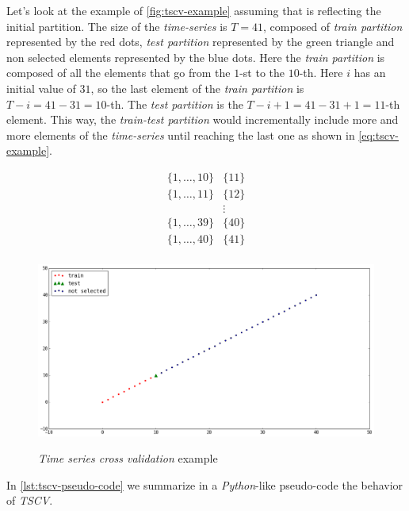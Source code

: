 Let's look at the example of \autoref{fig:tscv-example} assuming that
is reflecting the initial partition. The size of the
\textit{time-series} is $T = 41$, composed of \textit{train partition}
represented by the red dots, \textit{test partition} represented by
the green triangle and non selected elements represented by the blue
dots. Here the \textit{train partition} is composed of all the
elements that go from the $1$-st to the $10$-th. Here $i$ has an
initial value of $31$, so the last element of the \textit{train
partition} is $T - i = 41 - 31 = 10$-th. The \textit{test partition}
is the $T - i + 1 = 41 - 31 + 1 = 11$-th element. This way, the
\textit{train-test partition} would incrementally include more and
more elements of the \textit{time-series} until reaching the last one
as shown in \autoref{eq:tscv-example}.

\begin{equation}
  \begin{aligned}
    \label{eq:tscv-example}
    \{1,\dots,10\} & \{11\} \\
    \{1,\dots,11\} & \{12\} \\
    &\vdots \\
    \{1,\dots,39\} & \{40\} \\
    \{1,\dots,40\} & \{41\} \\
  \end{aligned}
\end{equation}

\begin{figure}[bth]
  \myfloatalign
  {\includegraphics[width=1\linewidth]
    {gfx/tscv-example}}
  \caption{\textit{Time series cross validation} example}
  \label{fig:tscv-example}
\end{figure}

In \autoref{lst:tscv-pseudo-code} we summarize in a
\textit{Python}-like pseudo-code the behavior of \textit{TSCV}.

